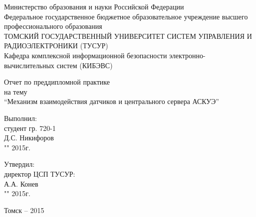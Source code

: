 \newpage
{}

\begin{center}
Министерство образования и науки Российской Федерации\\
Федеральное государственное бюджетное образовательное учреждение высшего профессионального образования\\
ТОМСКИЙ ГОСУДАРСТВЕННЫЙ УНИВЕРСИТЕТ СИСТЕМ УПРАВЛЕНИЯ И РАДИОЭЛЕКТРОНИКИ (ТУСУР)\\
Кафедра комплексной информационной безопасности электронно-вычислительных систем (КИБЭВС)\\
\end{center}

\vspace{2cm}

\begin{center}
Отчет по преддипломной практике \\
на тему \\
``Механизм взаимодействия датчиков и центрального сервера АСКУЭ''
\end{center}

\vspace{2cm}

\begin{flushright}
Выполнил: \\
студент гр. 720-1 \\
\underline{\hspace{2.5cm}}Д.С. Никифоров \\
"\underline{\hspace{1cm}}"\underline{\hspace{3cm}} 2015г.\\
\end{flushright}

\begin{flushright}
Утвердил: \\
директор ЦСП ТУСУР: \\
\underline{\hspace{2.5cm}}А.А. Конев \\
"\underline{\hspace{1cm}}"\underline{\hspace{3cm}} 2015г.\\
\end{flushright}

\vfill
\begin{center}
Томск -- 2015
\end{center}